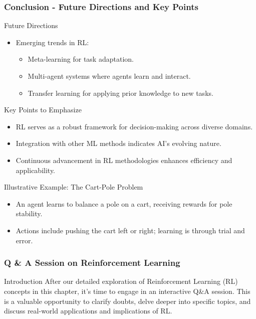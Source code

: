 \documentclass[aspectratio=169]{beamer}
\begin{document}
\begin{frame}[fragile]
    \frametitle{Conclusion - Future Directions and Key Points}
    
    \begin{block}{Future Directions}
        \begin{itemize}
            \item Emerging trends in RL:
            \begin{itemize}
                \item Meta-learning for task adaptation.
                \item Multi-agent systems where agents learn and interact.
                \item Transfer learning for applying prior knowledge to new tasks.
            \end{itemize}
        \end{itemize}
    \end{block}
    
    \begin{block}{Key Points to Emphasize}
        \begin{itemize}
            \item RL serves as a robust framework for decision-making across diverse domains.
            \item Integration with other ML methods indicates AI's evolving nature.
            \item Continuous advancement in RL methodologies enhances efficiency and applicability.
        \end{itemize}
    \end{block}
    
    \begin{block}{Illustrative Example: The Cart-Pole Problem}
        \begin{itemize}
            \item An agent learns to balance a pole on a cart, receiving rewards for pole stability.
            \item Actions include pushing the cart left or right; learning is through trial and error.
        \end{itemize}
    \end{block}
    
\end{frame}

\begin{frame}[fragile]
    \frametitle{Q \& A Session on Reinforcement Learning}
    \begin{block}{Introduction}
        After our detailed exploration of Reinforcement Learning (RL) concepts in this chapter, it's time to engage in an interactive Q\&A session.
        This is a valuable opportunity to clarify doubts, delve deeper into specific topics, and discuss real-world applications and implications of RL.
    \end{block}
\end{frame}
\end{document}
